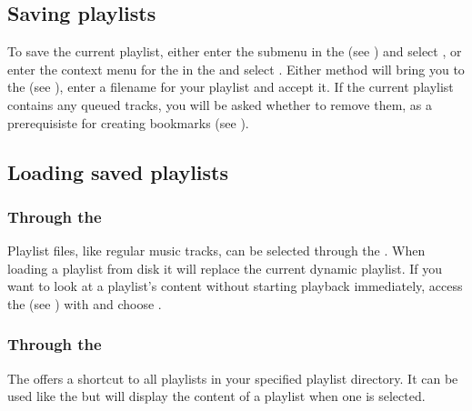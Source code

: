 \subsection{Saving playlists}
To save the current playlist, either enter the  submenu
in the  (see ) and
select , or enter the context menu for the
 in the  and select
.
Either method will bring you to the  (see
), enter a filename for your playlist and
accept it. If the current playlist contains any queued tracks, you will be
asked whether to remove them, as a prerequisiste for creating bookmarks
(see ).

\subsection{Loading saved playlists}
\subsubsection{Through the }
Playlist files, like regular music tracks, can be selected through the
. When loading a playlist from disk it will replace
the current dynamic playlist. If you want to look at a playlist's
content without starting playback immediately, access the  (see
) with \ActionStdContext{} and choose .

\subsubsection{Through the }
The  offers a shortcut to all playlists in your
\daps{} specified playlist directory.
It can be used like the  but will display
the content of a playlist when one is selected.

